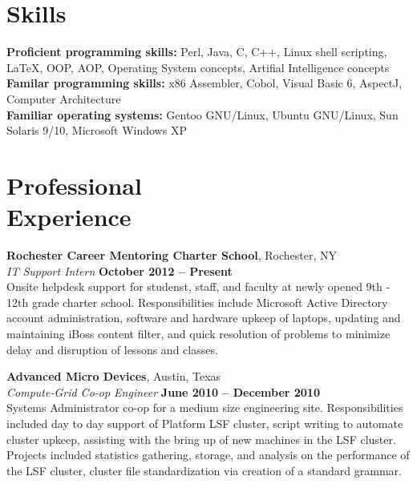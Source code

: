 \documentclass[margin,line]{resume}
\begin{document}
\begin{resume}
    \section{\mysidestyle Skills} 

    \textbf{Proficient programming skills:} 
    Perl, Java, C, C++, Linux shell scripting, \LaTeX, OOP, AOP, Operating System concepts, Artifial Intelligence concepts\\
    \textbf{Familar programming skills:} 
    x86 Assembler, Cobol, Visual Basic 6, AspectJ, Computer Architecture\\
    \textbf{Familiar operating systems:}
    Gentoo GNU/Linux, Ubuntu GNU/Linux, Sun Solaris 9/10, Microsoft Windows XP 

    \section{\mysidestyle Professional\\Experience}

    \textbf{Rochester Career Mentoring Charter School}, Rochester, NY \vspace{2mm}\\\vspace{1mm}%
    \textsl{IT Support Intern} \hfill \textbf{October 2012 -- Present}\\\vspace{0.5mm}%
    Onsite helpdesk support for studenst, staff, and faculty at newly opened 9th - 12th grade charter school.
    Responsibilities include Microsoft Active Directory account administration, software and hardware upkeep of
    laptops, updating and maintaining iBoss content filter, and quick resolution of problems to minimize
    delay and disruption of lessons and classes.

    \textbf{Advanced Micro Devices}, Austin, Texas \vspace{2mm}\\\vspace{1mm}%
    \textsl{Compute-Grid Co-op Engineer} \hfill \textbf{June 2010 -- December 2010}\\\vspace{0.5mm}%
    Systems Administrator co-op for a medium size engineering site. Responsibilities included day to day
    support of Platform LSF cluster, script writing to automate cluster upkeep, assisting with the bring up
    of new machines in the LSF cluster.  Projects included statistics gathering, storage, and analysis on
    the performance of the LSF cluster, cluster file standardization via creation of a standard grammar.


\end{resume}
\end{document}
